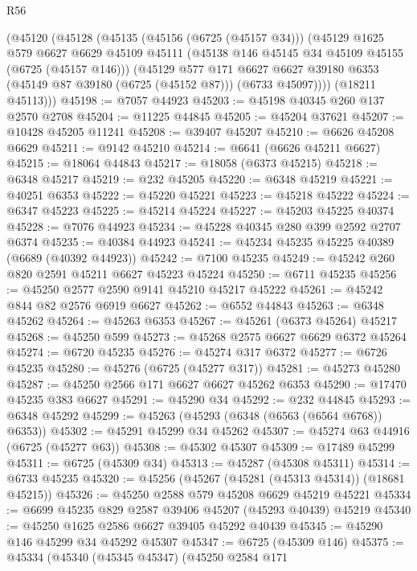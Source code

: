 \begin{lexlean}{R56}
\begin{coremodule}
    (@45120
      (@45128
        (@45135
          (@45156 (@6725 (@45157 @34)))
          (@45129
            @1625
            @579
            @6627
            @6629
            @45109
            @45111
            (@45138 @146 @45145 @34 @45109 @45155 (@6725 (@45157 @146)))
            (@45129
              @577
              @171
              @6627
              @6627
              @39180
              @6353
              (@45149 @87 @39180 (@6725 (@45152 @87)))
              (@6733 @45097))))
        (@18211 @45113)))
@45198 := @7057 @44923
@45203 := @45198 @40345 @260 @137 @2570 @2708
@45204 := @11225 @44845
@45205 := @45204 @37621
@45207 := @10428 @45205 @11241
@45208 := @39407 @45207
@45210 := @6626 @45208 @6629
@45211 := @9142 @45210
@45214 := @6641 (@6626 @45211 @6627)
@45215 := @18064 @44843
@45217 := @18058 (@6373 @45215)
@45218 := @6348 @45217
@45219 := @232 @45205
@45220 := @6348 @45219
@45221 := @40251 @6353
@45222 := @45220 @45221
@45223 := @45218 @45222
@45224 := @6347 @45223
@45225 := @45214 @45224
@45227 := @45203 @45225 @40374
@45228 := @7076 @44923
@45234 := @45228 @40345 @280 @399 @2592 @2707 @6374
@45235 := @40384 @44923
@45241 := @45234 @45235 @45225 @40389 (@6689 (@40392 @44923))
@45242 := @7100 @45235
@45249 := @45242 @260 @820 @2591 @45211 @6627 @45223 @45224
@45250 := @6711 @45235
@45256 := @45250 @2577 @2590 @9141 @45210 @45217 @45222
@45261 := @45242 @844 @82 @2576 @6919 @6627
@45262 := @6552 @44843
@45263 := @6348 @45262
@45264 := @45263 @6353
@45267 := @45261 (@6373 @45264) @45217
@45268 := @45250 @599
@45273 := @45268 @2575 @6627 @6629 @6372 @45264
@45274 := @6720 @45235
@45276 := @45274 @317 @6372
@45277 := @6726 @45235
@45280 := @45276 (@6725 (@45277 @317))
@45281 := @45273 @45280
@45287 := @45250 @2566 @171 @6627 @6627 @45262 @6353
@45290 := @17470 @45235 @383 @6627
@45291 := @45290 @34
@45292 := @232 @44845
@45293 := @6348 @45292
@45299 := @45263 (@45293 (@6348 (@6563 (@6564 @6768)) @6353))
@45302 := @45291 @45299 @34 @45262
@45307 := @45274 @63 @44916 (@6725 (@45277 @63))
@45308 := @45302 @45307
@45309 := @17489 @45299
@45311 := @6725 (@45309 @34)
@45313 := @45287 (@45308 @45311)
@45314 := @6733 @45235
@45320 := @45256 (@45267 (@45281 (@45313 @45314)) (@18681 @45215))
@45326 := @45250 @2588 @579 @45208 @6629 @45219 @45221
@45334 := @6699 @45235 @829 @2587 @39406 @45207 (@45293 @40439) @45219
@45340 := @45250 @1625 @2586 @6627 @39405 @45292 @40439
@45345 := @45290 @146 @45299 @34 @45292 @45307
@45347 := @6725 (@45309 @146)
@45375 := @45334
    (@45340
      (@45345 @45347)
      (@45250
        @2584
        @171

\end{coremodule}
\end{lexlean}
